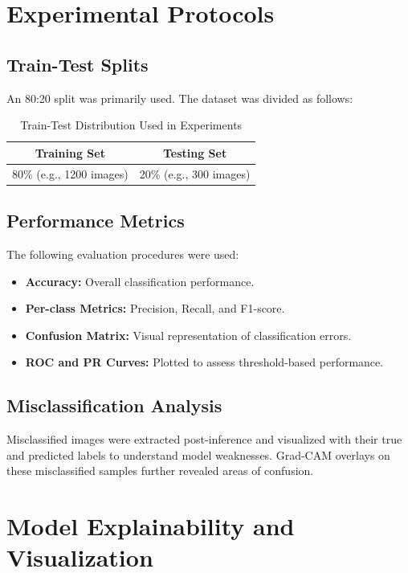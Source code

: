 \documentclass[a4paper,12pt]{report}
\begin{document}
\section{Experimental Protocols}

\subsection{Train-Test Splits}

An 80:20 split was primarily used. The dataset was divided as follows:
\begin{table}[h!]
\centering
\begin{tabular}{|c|c|}
\hline
\textbf{Training Set} & \textbf{Testing Set} \\ \hline
80\% (e.g., 1200 images) & 20\% (e.g., 300 images) \\ \hline
\end{tabular}
\caption{Train-Test Distribution Used in Experiments}
\end{table}

\subsection{Performance Metrics}

The following evaluation procedures were used:
\begin{itemize}
    \item \textbf{Accuracy:} Overall classification performance.
    \item \textbf{Per-class Metrics:} Precision, Recall, and F1-score.
    \item \textbf{Confusion Matrix:} Visual representation of classification errors.
    \item \textbf{ROC and PR Curves:} Plotted to assess threshold-based performance.
\end{itemize}

\subsection{Misclassification Analysis}

Misclassified images were extracted post-inference and visualized with their true and predicted labels to understand model weaknesses. Grad-CAM overlays on these misclassified samples further revealed areas of confusion.

\section{Model Explainability and Visualization}
\end{document}
